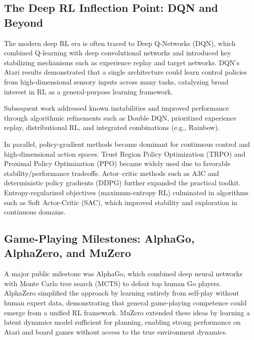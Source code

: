 \documentclass[sigconf]{acmart}
\begin{document}
\subsection{The Deep RL Inflection Point: DQN and Beyond}

The modern deep RL era is often traced to Deep Q-Networks (DQN), which combined Q-learning with deep convolutional networks and introduced key stabilizing mechanisms such as experience replay and target networks.\cite{mnih2015dqn}
DQN's Atari results demonstrated that a single architecture could learn control policies from high-dimensional sensory inputs across many tasks, catalyzing broad interest in RL as a general-purpose learning framework.

Subsequent work addressed known instabilities and improved performance through algorithmic refinements such as Double DQN,\cite{hasselt2016double}
prioritized experience replay,\cite{schaul2016prioritized}
distributional RL,\cite{bellemare2017distributional}
and integrated combinations (e.g., Rainbow).\cite{hessel2018rainbow}

In parallel, policy-gradient methods became dominant for continuous control and high-dimensional action spaces.
Trust Region Policy Optimization (TRPO) and Proximal Policy Optimization (PPO) became widely used due to favorable stability/performance tradeoffs.\cite{schulman2015trpo,schulman2017ppo}
Actor--critic methods such as A3C and deterministic policy gradients (DDPG) further expanded the practical toolkit.\cite{mnih2016a3c,lillicrap2016ddpg}
Entropy-regularized objectives (maximum-entropy RL) culminated in algorithms such as Soft Actor-Critic (SAC), which improved stability and exploration in continuous domains.\cite{haarnoja2018sac}

\subsection{Game-Playing Milestones: AlphaGo, AlphaZero, and MuZero}

A major public milestone was AlphaGo, which combined deep neural networks with Monte Carlo tree search (MCTS) to defeat top human Go players.\cite{silver2016alphago}
AlphaZero simplified the approach by learning entirely from self-play without human expert data, demonstrating that general game-playing competence could emerge from a unified RL framework.\cite{silver2017alphazero}
MuZero extended these ideas by learning a latent dynamics model sufficient for planning, enabling strong performance on Atari and board games without access to the true environment dynamics.\cite{schrittwieser2020muzero}
\end{document}
